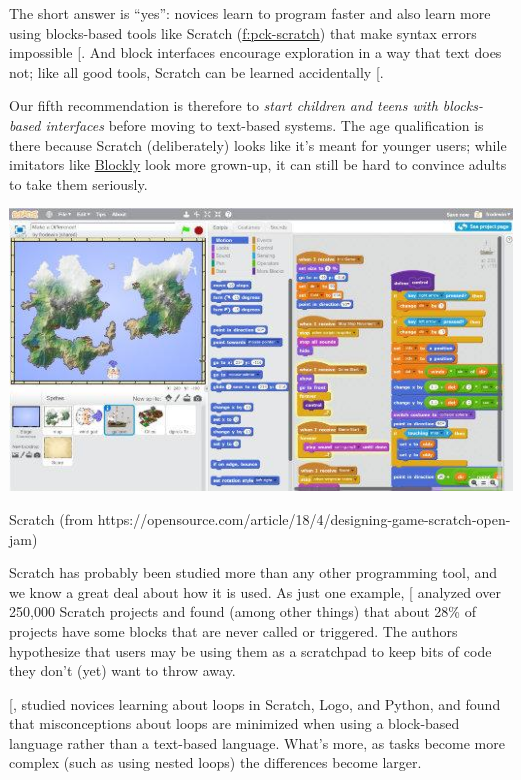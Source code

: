 The short answer is ``yes'': novices learn to program faster and also
learn more using blocks-based tools like Scratch
(\protect\hyperlink{FIGURE}{f:pck-scratch}) that make syntax errors impossible
{[}\protect[\hyperlink{b:Wein2017b}{Wein2017b}]{]}. And block interfaces encourage exploration in a way
that text does not; like all good tools, Scratch can be learned
accidentally {[}\protect[\hyperlink{b:Malo2010}{Malo2010}]{]}.

Our fifth recommendation is therefore to \emph{start children and teens
with blocks-based interfaces} before moving to text-based systems. The
age qualification is there because Scratch (deliberately) looks like
it's meant for younger users; while imitators like \href{https://developers.google.com/blockly/}{Blockly}
look more grown-up, it can still be hard to convince adults to take
them seriously.

\includegraphics{../../files/scratch.jpg}

Scratch (from https://opensource.com/article/18/4/designing-game-scratch-open-jam)

Scratch has probably been studied more than any other programming tool,
and we know a great deal about how it is used. As just one example,
{[}\protect[\hyperlink{b:Aiva2016}{Aiva2016}]{]} analyzed over 250,000 Scratch projects and found
(among other things) that about 28\% of projects have some blocks that
are never called or triggered. The authors hypothesize that users may be
using them as a scratchpad to keep bits of code they don't (yet) want to
throw away.

{[},\protect[\hyperlink{b:Mlad2017}{Mlad2017}]{]} studied novices learning about loops in
Scratch, Logo, and Python, and found that misconceptions about loops are
minimized when using a block-based language rather than a text-based
language. What's more, as tasks become more complex (such as using
nested loops) the differences become larger.

